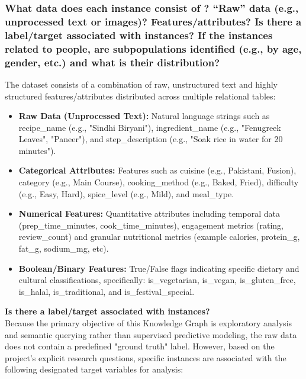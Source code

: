 \documentclass{article}
\newcommand{\question}[1]{#1}
\begin{document}
\question{\subsubsection*{What data does each instance consist of ? “Raw” data (e.g., unprocessed text or images)? Features/attributes? Is there a label/target associated with
instances? If the instances related to people, are subpopulations identified (e.g., by age, gender, etc.) and what is
their distribution?}}

The dataset consists of a combination of raw, unstructured text and highly structured features/attributes distributed across multiple relational tables:
\begin{itemize}
    \item \textbf{Raw Data (Unprocessed Text):} Natural language strings such as recipe\_name (e.g., "Sindhi Biryani"), ingredient\_name (e.g., "Fenugreek Leaves", "Paneer"), and step\_description (e.g., "Soak rice in water for 20 minutes").
    \item \textbf{Categorical Attributes:} Features such as cuisine (e.g., Pakistani, Fusion), category (e.g., Main Course), cooking\_method (e.g., Baked, Fried), difficulty (e.g., Easy, Hard), spice\_level (e.g., Mild), and meal\_type.
    \item \textbf{Numerical Features:} Quantitative attributes including temporal data (prep\_time\_minutes, cook\_time\_minutes), engagement metrics (rating, review\_count) and granular nutritional metrics (example calories, protein\_g, fat\_g, sodium\_mg, etc).
    \item \textbf{Boolean/Binary Features:} True/False flags indicating specific dietary and cultural classifications, specifically: is\_vegetarian, is\_vegan, is\_gluten\_free, is\_halal, is\_traditional, and is\_festival\_special.
\end{itemize}

\textbf{Is there a label/target associated with instances?} \\
Because the primary objective of this Knowledge Graph is exploratory analysis and semantic querying rather than supervised predictive modeling, the raw data does not contain a predefined "ground truth" label. However, based on the project's explicit research questions, specific instances are associated with the following designated target variables for analysis:
\end{document}
